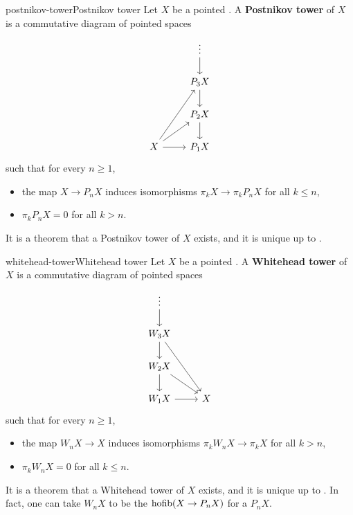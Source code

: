 \begin{topic}{postnikov-tower}{Postnikov tower}
    Let $X$ be a  pointed . A \textbf{Postnikov tower} of $X$ is a commutative diagram of pointed spaces
    \[ \begin{tikzcd}
        & \vdots \arrow{d} \\ & P_3 X \arrow{d} \\ & P_2 X \arrow{d} \\ X \arrow{r} \arrow{ru} \arrow{ruu} & P_1 X
    \end{tikzcd} \]
    such that for every $n \ge 1$,
    \begin{itemize}
        \item the map $X \to P_n X$ induces isomorphisms $\pi_k X \to \pi_k P_n X$ for all $k \le n$,
        \item $\pi_k P_n X = 0$ for all $k > n$.
    \end{itemize}
    It is a theorem that a Postnikov tower of $X$ exists, and it is unique up to .
\end{topic}

\begin{topic}{whitehead-tower}{Whitehead tower}
    Let $X$ be a  pointed . A \textbf{Whitehead tower} of $X$ is a commutative diagram of pointed spaces
    \[ \begin{tikzcd}
        \vdots \arrow{d} & \\ W_3 X \arrow{d} \arrow{ddr} & \\ W_2 X \arrow{d} \arrow{dr} & \\ W_1 X \arrow{r} & X
    \end{tikzcd} \]
    such that for every $n \ge 1$,
    \begin{itemize}
        \item the map $W_n X \to X$ induces isomorphisms $\pi_k W_n X \to \pi_k X$ for all $k > n$,
        \item $\pi_k W_n X = 0$ for all $k \le n$.
    \end{itemize}
    It is a theorem that a Whitehead tower of $X$ exists, and it is unique up to . In fact, one can take $W_n X$ to be the  $\textup{hofib}(X \to P_n X)$ for a  $P_n X$.
\end{topic}

